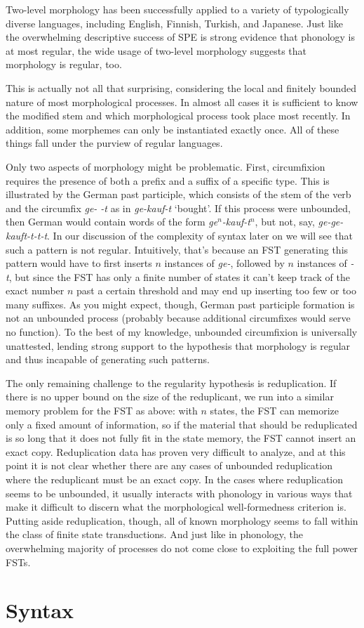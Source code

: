 Two-level morphology has been successfully applied to a variety of typologically diverse languages, including English, Finnish, Turkish, and Japanese.
Just like the overwhelming descriptive success of SPE is strong evidence that phonology is at most regular, the wide usage of two-level morphology suggests that morphology is regular, too.

This is actually not all that surprising, considering the local and finitely bounded nature of most morphological processes.
In almost all cases it is sufficient to know the modified stem and which morphological process took place most recently.
In addition, some morphemes can only be instantiated exactly once.
All of these things fall under the purview of regular languages.

Only two aspects of morphology might be problematic.
First, circumfixion requires the presence of both a prefix and a suffix of a specific type.
This is illustrated by the German past participle, which consists of the stem of the verb and the circumfix \emph{ge- -t} as in \emph{ge-kauf-t} `bought'.
If this process were unbounded, then German would contain words of the form \emph{ge$^n$-kauf-t$^n$}, but not, say, \emph{ge-ge-kauft-t-t-t}.
In our discussion of the complexity of syntax later on we will see that such a pattern is not regular.
Intuitively, that's because an FST generating this pattern would have to first inserts $n$ instances of \emph{ge-}, followed by $n$ instances of \emph{-t}, but since the FST has only a finite number of states it can't keep track of the exact number $n$ past a certain threshold and may end up inserting too few or too many suffixes.
As you might expect, though, German past participle formation is not an unbounded process (probably because additional circumfixes would serve no function).
To the best of my knowledge, unbounded circumfixion is universally unattested, lending strong support to the hypothesis that morphology is regular and thus incapable of generating such patterns.

The only remaining challenge to the regularity hypothesis is reduplication.
If there is no upper bound on the size of the reduplicant, we run into a similar memory problem for the FST as above: with $n$ states, the FST can memorize only a fixed amount of information, so if the material that should be reduplicated is so long that it does not fully fit in the state memory, the FST cannot insert an exact copy.
Reduplication data has proven very difficult to analyze, and at this point it is not clear whether there are any cases of unbounded reduplication where the reduplicant must be an exact copy.
In the cases where reduplication seems to be unbounded, it usually interacts with phonology in various ways that make it difficult to discern what the morphological well-formedness criterion is.
Putting aside reduplication, though, all of known morphology seems to fall within the class of finite state transductions.
And just like in phonology, the overwhelming majority of processes do not come close to exploiting the full power FSTs.

\section{Syntax}
